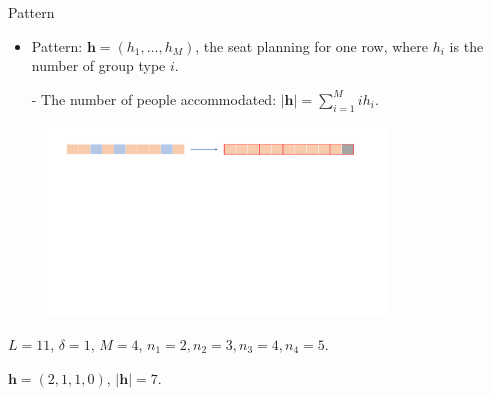   \begin{frame}{Pattern}
    \begin{itemize}
      \item Pattern: $\bm{h} = (h_1, \ldots, h_M)$, the seat planning for one row, where $h_i$ is the number of group type $i$.

      - The number of people accommodated: $|\bm{h}| = \sum_{i =1}^{M} i h_i$.
    \end{itemize}
    
    \begin{figure}[ht]
      \centering
      \includegraphics[width = 0.8\textwidth]{./images/dummy_seat.pdf}
    \end{figure}
    \centering
    $L = 11$, $\delta =1$, $M =4$, $n_1 = 2, n_2 = 3, n_3 = 4, n_4 = 5$. 

    $\bm{h} = (2, 1, 1, 0)$, $|\bm{h}| = 7$.
  \end{frame}

